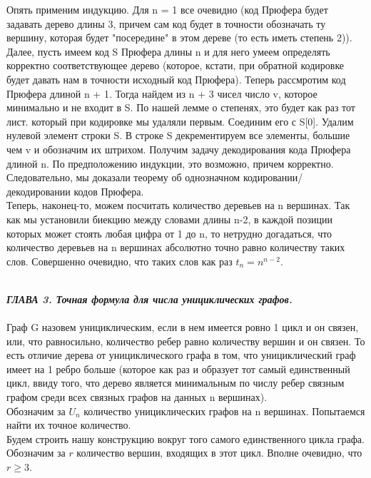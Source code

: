 \documentclass[12pt]{article}
\begin{document}
Опять применим индукцию. Для n = 1 все очевидно (код Прюфера будет задавать дерево длины 3, причем сам код будет в точности обозначать ту вершину, которая будет "посередине" в этом дереве (то есть иметь степень 2)). Далее, пусть имеем код S Прюфера длины n и для него умеем определять корректно соответствующее дерево (которое, кстати, при обратной кодировке будет давать нам в точности исходный код Прюфера). Теперь рассмротим код Прюфера длиной n + 1. Тогда найдем из n + 3 чисел число v, которое минимально и не входит в S. По нашей лемме о степенях, это будет как раз тот лист. который при кодировке мы удаляли первым. Соединим его с S[0]. Удалим нулевой элемент строки S. В строке S декрементируем все элементы, большие чем v и обозначим их штрихом. Получим задачу декодирования кода Прюфера длиной n. По предположению индукции, это возможно, причем корректно. Следовательно, мы доказали теорему об однозначном кодировании/декодировании кодов Прюфера.\\

Теперь, наконец-то, можем посчитать количество деревьев на n вершинах. Так как мы установили биекцию между словами длины n-2, в каждой позиции которых может стоять любая цифра от 1 до n, то нетрудно догадаться, что количество деревьев на n вершинах абсолютно точно равно количеству таких слов. Совершенно очевидно, что таких слов как раз \(t_{n} = n^{n-2}\).

\newpage
\\
\textbf{\textit{ГЛАВА 3. Точная формула для числа унициклических графов.}}
\\
\\

Граф G назовем унициклическим, если в нем имеется ровно 1 цикл и он связен, или, что равносильно, количество ребер равно количеству вершин и он связен. То есть отличие дерева от унициклического графа в том, что унициклический граф имеет на 1 ребро больше (которое как раз и образует тот самый единственный цикл, ввиду того, что дерево является минимальным по числу ребер связным графом среди всех связных графов на данных n вершинах).\\

Обозначим за \(\mathit{U_{n}}\) количество унициклических графов на n вершинах. Попытаемся найти их точное количество.\\

Будем строить нашу конструкцию вокруг того самого единственного цикла графа. Обозначим за \(\mathit{r}\) количество вершин, входящих в этот цикл. Вполне очевидно, что \(\mathit{r \geq 3}\). \\
\end{document}
